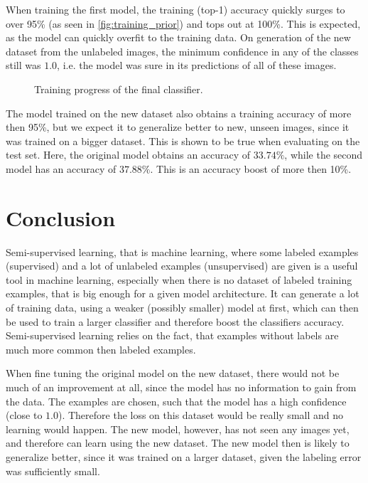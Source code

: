 \documentclass[a4paper,onecolumn,oneside,11pt,english,bibliography=totoc]{article}
\newcommand{\1}{\mathds{1}}
\theoremstyle{breakit}
\theoremstyle{break}
\begin{document}
	When training the first model, the training (top-1) accuracy quickly surges to over 95\% (as seen in \cref{fig:training_prior}) and tops out at 100\%. This is expected, as the model can quickly overfit to the training data. On generation of the new dataset from the unlabeled images, the minimum confidence in any of the classes still was $1.0$, i.e. the model was sure in its predictions of all of these images.
	
	\begin{figure}[h]
	    \centering
	    \resizebox{\textwidth}{!}{}
	    \caption{Training progress of the final classifier.}
	    \label{fig:training_classifier}
	\end{figure}
	
	The model trained on the new dataset also obtains a training accuracy of more then 95\%, but we expect it to generalize better to new, unseen images, since it was trained on a bigger dataset.
	This is shown to be true when evaluating on the test set. Here, the original model obtains an accuracy of $33.74\%$, while the second model has an accuracy of $37.88\%$. This is an accuracy boost of more then 10\%.
	
	\section*{Conclusion}
	Semi-supervised learning, that is machine learning, where some labeled examples (supervised) and a lot of unlabeled examples (unsupervised) are given is a useful tool in machine learning, especially when there is no dataset of labeled training examples, that is big enough for a given model architecture. It can generate a lot of training data, using a weaker (possibly smaller) model at  first, which can then be used to train a larger classifier and therefore boost the classifiers accuracy. Semi-supervised learning relies on the fact, that examples without labels are much more common then labeled examples.
	
	When fine tuning the original model on the new dataset, there would not be much of an improvement at all, since the model has no information to gain from the data. The examples are chosen, such that the model has a high confidence (close to $1.0$). Therefore the loss on this dataset would be really small and no learning would happen. The new model, however, has not seen any images yet, and therefore can learn using the new dataset. The new model then is likely to generalize better, since it was trained on a larger dataset, given the labeling error was sufficiently small.
	
\end{document}
